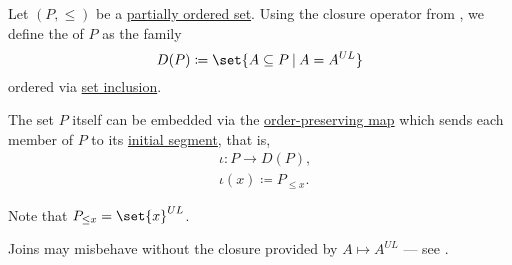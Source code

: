 \begin{definition}\label{def:dedekind_macnielle_completion}
  Let \( (P, \leq) \) be a \hyperref[def:partially_ordered_set]{partially ordered set}. Using the closure operator from , we define the  of \( P \) as the family
  \begin{equation*}
    D(P) \coloneqq \set{ A \subseteq P \given A = A^{UL} }
  \end{equation*}
  ordered via \hyperref[def:subset]{set inclusion}.

  The set \( P \) itself can be embedded via the \hyperref[def:order_homomorphism/increasing]{order-preserving map} which sends each member of \( P \) to its \hyperref[def:order_interval/ray]{initial segment}, that is,
  \begin{equation*}
    \begin{aligned}
      &\iota: P \to D(P), \\
      &\iota(x) \coloneqq P_{\leq x}.
    \end{aligned}
  \end{equation*}
\end{definition}
\begin{comments}
  \item Note that \( P_{\leq x} = \set{ x }^{UL} \).
  \item Joins may misbehave without the closure provided by \( A \mapsto A^{UL} \) --- see .
\end{comments}

